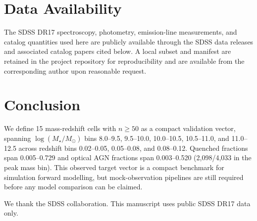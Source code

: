 \documentclass[twocolumn]{aastex631}
\begin{document}
\section{Data Availability}\label{sec:data-avail}
The SDSS DR17 spectroscopy, photometry, emission-line measurements, and catalog quantities used here are publicly available through the SDSS data releases and associated catalog papers cited below. A local subset and manifest are retained in the project repository for reproducibility and are available from the corresponding author upon reasonable request.

\section{Conclusion}\label{sec:conclusion}
We define 15 mass-redshift cells with $n \geq 50$ as a compact validation vector, spanning $\log(M_\star/M_\odot)$ bins 8.0--9.5, 9.5--10.0, 10.0--10.5, 10.5--11.0, and 11.0--12.5 across redshift bins 0.02--0.05, 0.05--0.08, and 0.08--0.12. Quenched fractions span 0.005--0.729 and optical AGN fractions span 0.003--0.520 (2,098/4,033 in the peak mass bin). This observed target vector is a compact benchmark for simulation forward modelling, but mock-observation pipelines are still required before any model comparison can be claimed.

\begin{acknowledgments}
We thank the SDSS collaboration. This manuscript uses public SDSS DR17 data only.
\end{acknowledgments}
\end{document}
